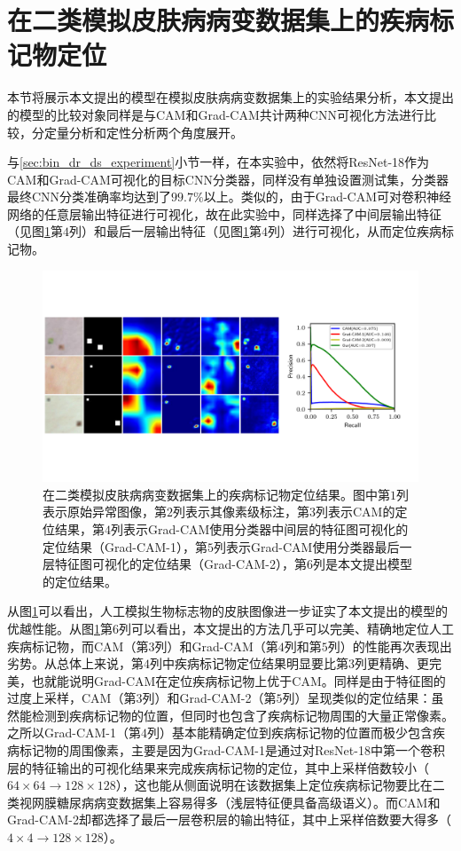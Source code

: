 \section{在二类模拟皮肤病病变数据集上的疾病标记物定位}\label{sec:bin_simulated_ds_experiment}
本节将展示本文提出的模型在模拟皮肤病病变数据集上的实验结果分析，本文提出的模型的比较对象同样是与CAM和Grad-CAM共计两种CNN可视化方法进行比较，分定量分析和定性分析两个角度展开。

与\ref{sec:bin_dr_ds_experiment}小节一样，在本实验中，依然将ResNet-18作为CAM和Grad-CAM可视化的目标CNN分类器，同样没有单独设置测试集，分类器最终CNN分类准确率均达到了$99.7\%$以上。类似的，由于Grad-CAM可对卷积神经网络的任意层输出特征进行可视化，故在此实验中，同样选择了中间层输出特征（见图\ref{fig:simulated_skin}第$4$列）和最后一层输出特征（见图\ref{fig:simulated_skin}第$4$列）进行可视化，从而定位疾病标记物。
\begin{figure}[h]
	\centering
	\includegraphics[width=1.0\textwidth]{figure/pr_curve_skin_image.pdf}
	\caption{在二类模拟皮肤病病变数据集上的疾病标记物定位结果。图中第$1$列表示原始异常图像，第$2$列表示其像素级标注，第$3$列表示CAM的定位结果，第$4$列表示Grad-CAM使用分类器中间层的特征图可视化的定位结果（Grad-CAM-1），第$5$列表示Grad-CAM使用分类器最后一层特征图可视化的定位结果（Grad-CAM-2），第$6$列是本文提出模型的定位结果。} 
	\label{fig:simulated_skin}
\end{figure}

\noindent 从图\ref{fig:simulated_skin}可以看出，人工模拟生物标志物的皮肤图像进一步证实了本文提出的模型的优越性能。从图\ref{fig:simulated_skin}第$6$列可以看出，本文提出的方法几乎可以完美、精确地定位人工疾病标记物，而CAM（第$3$列）和Grad-CAM（第$4$列和第$5$列）的性能再次表现出劣势。从总体上来说，第$4$列中疾病标记物定位结果明显要比第$3$列更精确、更完美，也就能说明Grad-CAM在定位疾病标记物上优于CAM。同样是由于特征图的过度上采样，CAM（第$3$列）和Grad-CAM-2（第$5$列）呈现类似的定位结果：虽然能检测到疾病标记物的位置，但同时也包含了疾病标记物周围的大量正常像素。之所以Grad-CAM-1（第$4$列）基本能精确定位到疾病标记物的位置而极少包含疾病标记物的周围像素，主要是因为Grad-CAM-1是通过对ResNet-18中第一个卷积层的特征输出的可视化结果来完成疾病标记物的定位，其中上采样倍数较小（$64\times 64\rightarrow 128\times 128$），这也能从侧面说明在该数据集上定位疾病标记物要比在二类视网膜糖尿病病变数据集上容易得多（浅层特征便具备高级语义）。而CAM和Grad-CAM-2却都选择了最后一层卷积层的输出特征，其中上采样倍数要大得多（$4\times4\rightarrow 128\times 128$）。

